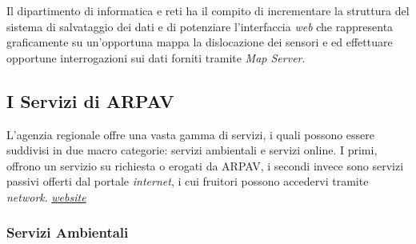 Il dipartimento di informatica e reti ha il compito di incrementare la struttura del sistema di salvataggio dei dati e di potenziare l'interfaccia \textit{web} che rappresenta graficamente su un'opportuna mappa la dislocazione dei sensori e ed effettuare opportune interrogazioni sui dati forniti tramite \textit{Map Server}.

\subsection{I Servizi di ARPAV}

L'agenzia regionale offre una vasta gamma di servizi, i quali possono essere suddivisi in due macro categorie: servizi ambientali e servizi online. I primi, offrono un servizio su richiesta o erogati da ARPAV, i secondi invece sono servizi passivi offerti dal portale \textit{internet}, i cui fruitori possono accedervi tramite \textit{network}.  \textit{\href{http://www.arpa.veneto.it/servizi-ambientali}{website}}

\subsubsection{Servizi Ambientali}

